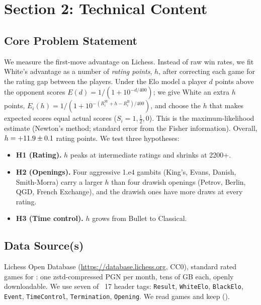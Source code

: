 \documentclass[11pt,a4paper]{article}
\begin{document}
\newpage


\section*{Section 2: Technical Content}

\subsection*{Core Problem Statement}
We measure the first-move advantage on Lichess. Instead of raw win rates, we fit White's
advantage as a number of \emph{rating points}, $h$, after correcting each game for the rating
gap between the players. Under the Elo model a player $d$ points above the opponent scores
$E(d)=1/(1+10^{-d/400})$; we give White an extra $h$ points,
$E_i(h)=1/(1+10^{-(R^{\mathrm W}_i+h-R^{\mathrm B}_i)/400})$, and choose the $h$ that makes
expected scores equal actual scores ($S_i=1,\tfrac12,0$). This is the maximum-likelihood
estimate (Newton's method; standard error from the Fisher information). Overall,
$h = +11.9 \pm 0.1$ rating points. We test three hypotheses:
\begin{itemize}
\item \textbf{H1 (Rating).} $h$ peaks at intermediate ratings and shrinks at 2200+.
\item \textbf{H2 (Openings).} Four aggressive 1.e4 gambits (King's, Evans, Danish, Smith-Morra)
  carry a larger $h$ than four drawish openings (Petrov, Berlin, QGD, French Exchange), and the
  drawish ones have more draws at every rating.
\item \textbf{H3 (Time control).} $h$ grows from Bullet to Classical.
\end{itemize}

\subsection*{Data Source(s)}
Lichess Open Database (\url{https://database.lichess.org}, CC0), standard rated games for
\MonthList: one zstd-compressed PGN per month, tens of GB each, openly downloadable. We use
seven of ~17 header tags: \texttt{Result}, \texttt{WhiteElo}, \texttt{BlackElo},
\texttt{Event}, \texttt{TimeControl}, \texttt{Termination}, \texttt{Opening}. We read
\GamesRead{} games and keep \GamesUsed{} (\PctUsed).
\end{document}
